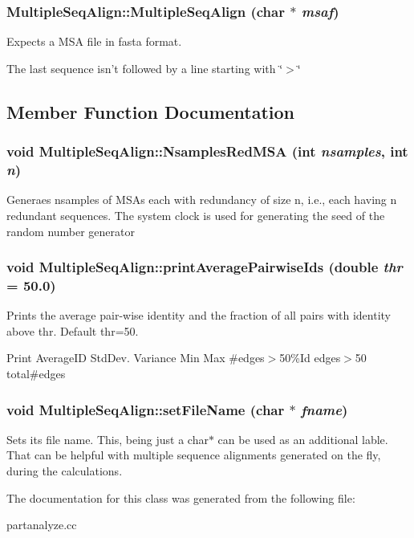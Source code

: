 \subsubsection{\setlength{\rightskip}{0pt plus 5cm}Multiple\-Seq\-Align::Multiple\-Seq\-Align (char $\ast$ {\em msaf})}\label{classMultipleSeqAlign_a1}


Expects a MSA file in fasta format. 

The last sequence isn't followed by a line starting with \char`\"{}$>$\char`\"{} 

\subsection{Member Function Documentation}
\subsubsection{\setlength{\rightskip}{0pt plus 5cm}void Multiple\-Seq\-Align::Nsamples\-Red\-MSA (int {\em nsamples}, int {\em n})}\label{classMultipleSeqAlign_a15}


Generaes nsamples of MSAs each with redundancy of size n, i.e., each having n redundant sequences. The system clock is used for generating the seed of the random number generator 
\subsubsection{\setlength{\rightskip}{0pt plus 5cm}void Multiple\-Seq\-Align::print\-Average\-Pairwise\-Ids (double {\em thr} = 50.0)}\label{classMultipleSeqAlign_a12}


Prints the average pair-wise identity and the fraction of all pairs with identity above thr. Default thr=50. 

Print Average\-ID Std\-Dev. Variance Min Max \#edges$>$50\%Id edges$>$50 total\#edges 
\subsubsection{\setlength{\rightskip}{0pt plus 5cm}void Multiple\-Seq\-Align::set\-File\-Name (char $\ast$ {\em fname})\hspace{0.3cm}{\tt  [inline]}}\label{classMultipleSeqAlign_a6}


Sets its file name. This, being just a char$\ast$ can be used as an additional lable. That can be helpful with multiple sequence alignments generated on the fly, during the calculations. 

The documentation for this class was generated from the following file:\begin{CompactItemize}
\item 
partanalyze.cc\end{CompactItemize}
